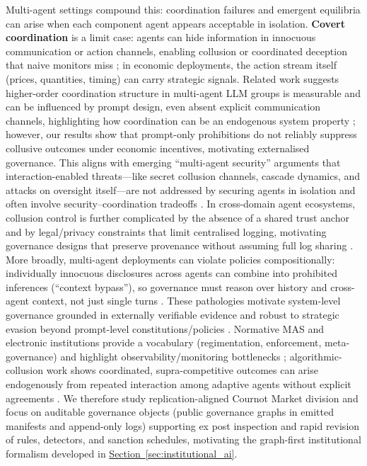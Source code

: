 \documentclass[11pt, a4paper]{article}
\begin{document}
Multi-agent settings compound this: coordination failures and emergent equilibria can arise when each component agent appears acceptable in isolation. \textbf{Covert coordination} is a limit case: agents can hide information in innocuous communication or action channels, enabling collusion or coordinated deception that naive monitors miss \citep{Motwani2024SecretCollusion,Mathew2024HiddenPlainText,Tailor2025AuditWhisper,Buscemi2026WhenNumbersStartTalking}; in economic deployments, the action stream itself (prices, quantities, timing) can carry strategic signals. Related work suggests higher-order coordination structure in multi-agent LLM groups is measurable and can be influenced by prompt design, even absent explicit communication channels, highlighting how coordination can be an endogenous system property \citep{Riedl2025EmergentCoordination}; however, our results show that prompt-only prohibitions do not reliably suppress collusive outcomes under economic incentives, motivating externalised governance. This aligns with emerging ``multi-agent security'' arguments that interaction-enabled threats---like secret collusion channels, cascade dynamics, and attacks on oversight itself---are not addressed by securing agents in isolation and often involve security--coordination tradeoffs \citep{SchroederDeWitt2025MultiAgentSecurity}. In cross-domain agent ecosystems, collusion control is further complicated by the absence of a shared trust anchor and by legal/privacy constraints that limit centralised logging, motivating governance designs that preserve provenance without assuming full log sharing \citep{Ko2025CrossDomainSecurity}. More broadly, multi-agent deployments can violate policies compositionally: individually innocuous disclosures across agents can combine into prohibited inferences (``context bypass''), so governance must reason over history and cross-agent context, not just single turns \citep{Ko2025CrossDomainSecurity}. These pathologies motivate system-level governance grounded in externally verifiable evidence and robust to strategic evasion beyond prompt-level constitutions/policies \citep{Palla2025PolicyAsPrompt,Hua2024TrustAgent,Greenblatt2024AIControl}. Normative MAS and electronic institutions provide a vocabulary (regimentation, enforcement, meta-governance) and highlight observability/monitoring bottlenecks \citep{Boella2007NormativeMAS,Esteva2001ElectronicInstitutions,Bulling2013MonitoringNormViolations}; algorithmic-collusion work shows coordinated, supra-competitive outcomes can arise endogenously from repeated interaction among adaptive agents without explicit agreements \citep{Calvano2020Algorithmic,EzrachiStucke2017AICollusion}. We therefore study replication-aligned Cournot Market division \citep{Lin2024Strategic} and focus on auditable governance objects (public governance graphs in emitted manifests and append-only logs) supporting ex post inspection and rapid revision of rules, detectors, and sanction schedules, motivating the graph-first institutional formalism developed in \hyperref[sec:institutional_ai]{Section~\ref*{sec:institutional_ai}}.
\end{document}
